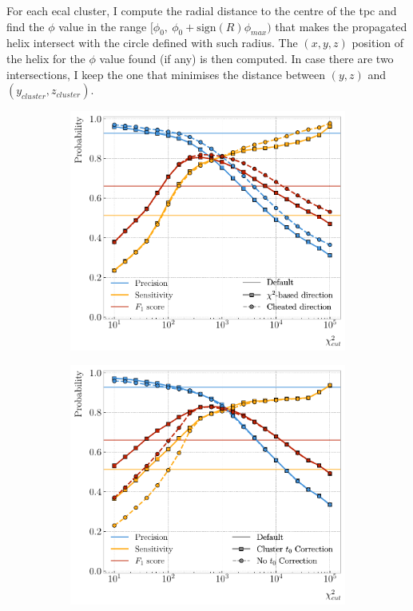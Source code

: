 For each \gls{ecal} cluster, I compute the radial distance to the centre of the \gls{tpc} and find the $\phi$ value in the range $[\phi_{0}, \ \phi_{0}+\mathrm{sign}(R)\phi_{max})$ that makes the propagated helix intersect with the circle defined with such radius. The $(x,y,z)$ position of the helix for the $\phi$ value found (if any) is then computed. In case there are two intersections, I keep the one that minimises the distance between $(y, z)$ and $(y_{cluster}, z_{cluster})$.

\begin{figure}[t]
	\begin{subfigure}{0.5\textwidth}
		\centering
		\includegraphics[width=.90\linewidth]{Images/GArSoft_PID/associations/helix_propagation_metrics_no_t0.pdf}
	\end{subfigure}
	\begin{subfigure}{0.5\textwidth}
		\centering
		\includegraphics[width=.90\linewidth]{Images/GArSoft_PID/associations/helix_propagation_metrics_ecal.pdf}

\end{subfigure}
\end{figure}
